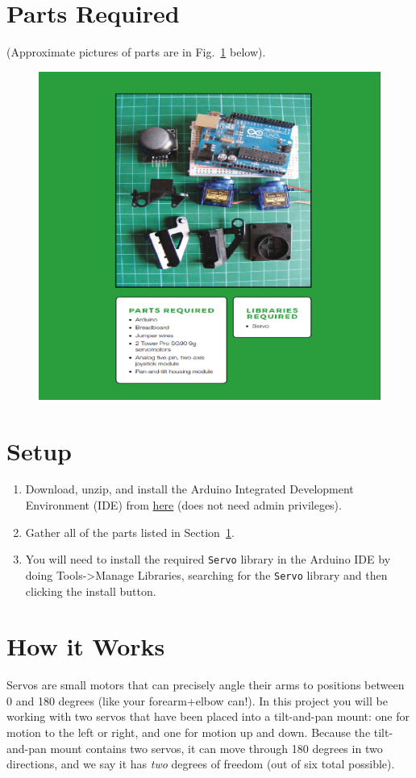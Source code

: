 \documentclass{article}
\begin{document}
\section{Parts Required}\label{sec:parts}
 (Approximate pictures of parts are in Fig.~\ref{fig:required-parts} below).

 \begin{figure}[H]
   \centering
   \includegraphics[width=.7\linewidth]{figures/required-parts.png}
   \caption{\label{fig:required-parts}}
 \end{figure}

 \section{Setup}
\begin{enumerate}
\item {Download, unzip, and install the Arduino Integrated Development Environment
    (IDE) from \href{https://www.arduino.cc/en/Main/Donate}{here} (does not need
    admin privileges). }
\item {Gather all of the parts listed in Section~\ref{sec:parts}}.
\item You will need to install the required \verb|Servo| library in the Arduino IDE
  by doing Tools->Manage Libraries, searching for the \verb|Servo| library and then
  clicking the install button.
\end{enumerate}

\section{How it Works}
Servos are small motors that can precisely angle their arms to positions between 0
and 180 degrees (like your forearm+elbow can!). In this project you will be working
with two servos that have been placed into a tilt-and-pan mount: one for motion to
the left or right, and one for motion up and down. Because the tilt-and-pan mount
contains two servos, it can move through 180 degrees in two directions, and we say it
has \emph{two} degrees of freedom (out of six total possible).
\end{document}
